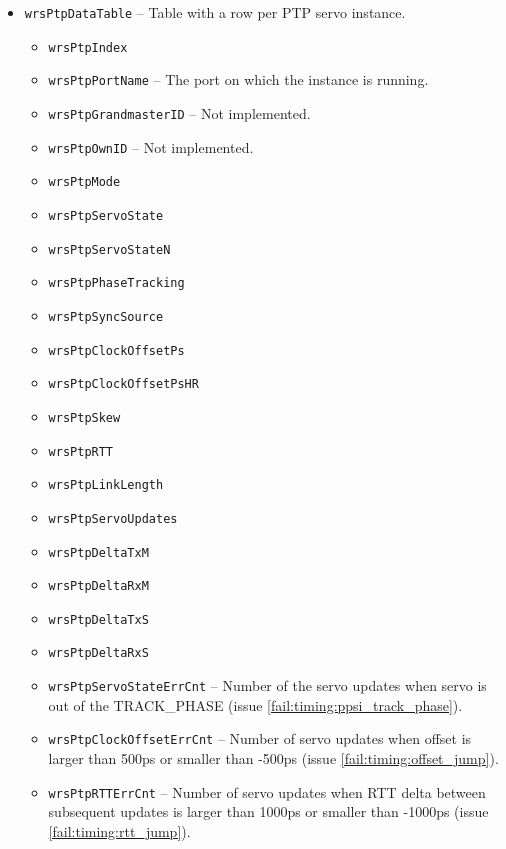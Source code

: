 \begin{itemize}
  \item \texttt{wrsPtpDataTable} -- Table with a row per PTP servo instance.
    \begin{itemize}
      \item \texttt{wrsPtpIndex}
      \item \texttt{wrsPtpPortName} -- The port on which the instance is running.
      \item \texttt{wrsPtpGrandmasterID} -- Not implemented.
      \item \texttt{wrsPtpOwnID} -- Not implemented.
      \item \texttt{wrsPtpMode}
      \item \texttt{wrsPtpServoState}
      \item \texttt{wrsPtpServoStateN}
      \item \texttt{wrsPtpPhaseTracking}
      \item \texttt{wrsPtpSyncSource}
      \item \texttt{wrsPtpClockOffsetPs}
      \item \texttt{wrsPtpClockOffsetPsHR}
      \item \texttt{wrsPtpSkew}
      \item \texttt{wrsPtpRTT}
      \item \texttt{wrsPtpLinkLength}
      \item \texttt{wrsPtpServoUpdates}
      \item \texttt{wrsPtpDeltaTxM}
      \item \texttt{wrsPtpDeltaRxM}
      \item \texttt{wrsPtpDeltaTxS}
      \item \texttt{wrsPtpDeltaRxS}
      \item \texttt{wrsPtpServoStateErrCnt} -- Number of the servo updates when
        servo is out of the TRACK\_PHASE (issue
        \ref{fail:timing:ppsi_track_phase}).
      \item \texttt{wrsPtpClockOffsetErrCnt} -- Number of servo updates when
        offset is larger than 500ps or smaller than -500ps (issue
        \ref{fail:timing:offset_jump}).
      \item \texttt{wrsPtpRTTErrCnt} -- Number of servo updates when RTT delta
        between subsequent updates is larger than 1000ps or smaller than -1000ps
        (issue \ref{fail:timing:rtt_jump}).
    \end{itemize}


\end{itemize}
